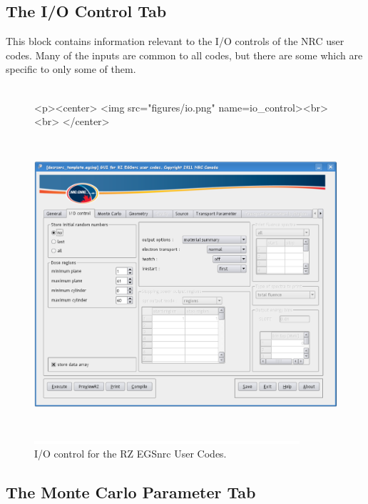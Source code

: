 \documentclass[12pt,twoside]{article}   %
\begin{document}
\newpage
\subsection{The I/O Control Tab}
\label{io}

This block contains information relevant to the I/O controls of the NRC user codes.
Many of the inputs are common to all codes, but there are some which are specific to
only some of them. \\ \\
\begin{figure}[htb]
\begin{htmlonly}
\begin{rawhtml}
<p><center>
<img src="figures/io.png" name=io_control><br><br>
</center>
\end{rawhtml}
\end{htmlonly}
\begin{latexonly}
\begin{center}
\includegraphics[height=10.78cm]{figures/io}
\end{center}
\end{latexonly}
\begin{center}
\includegraphics[height=1mm]{figures/fake2}
\end{center}
\caption{I/O control for the RZ EGSnrc User Codes.}
\label{io_control}
\end{figure}


\newpage
\subsection{The Monte Carlo Parameter Tab}
\label{mc}
\end{document}
